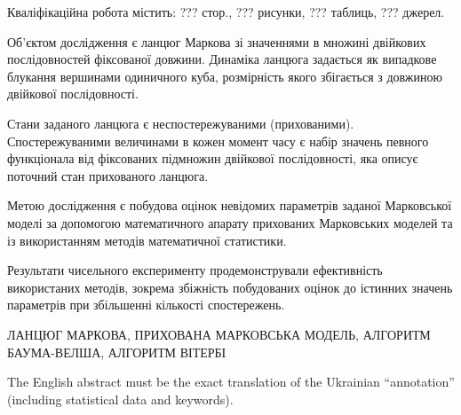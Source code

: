 
\abstractUkr

Кваліфікаційна робота містить: ??? стор., ??? рисунки, ??? таблиць, ??? джерел.

Об'єктом дослідження є ланцюг Маркова зі значеннями в множині двійкових послідовностей фіксованої довжини. Динаміка ланцюга задається як випадкове блукання вершинами одиничного куба, розмірність якого збігається з довжиною двійкової послідовності. 

Стани заданого ланцюга є неспостережуваними (прихованими). Спостережуваними величинами в кожен момент часу є набір значень певного функціонала від фіксованих підмножин двійкової послідовності, яка описує поточний стан прихованого ланцюга.

Метою дослідження є побудова оцінок невідомих параметрів заданої Марковської моделі за допомогою математичного апарату прихованих Марковських моделей та із використанням методів математичної статистики. 

Результати чисельного експерименту продемонстрували ефективність використаних методів, зокрема збіжність побудованих оцінок до істинних значень параметрів при збільшенні кількості спостережень.

\MakeUppercase{ЛАНЦЮГ МАРКОВА, ПРИХОВАНА МАРКОВСЬКА МОДЕЛЬ, АЛГОРИТМ БАУМА-ВЕЛША, АЛГОРИТМ ВІТЕРБІ}

\abstractEng

The English abstract must be the exact translation of the Ukrainian 
``annotation'' (including statistical data and keywords).

\clearpage